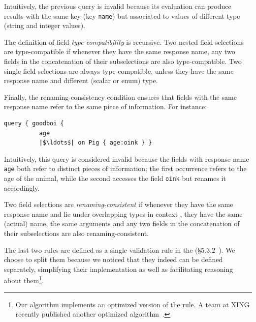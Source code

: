 Intuitively, the previous query is invalid because its evaluation can produce results with the same key 
(key \texttt{name}) but associated to values of different type (\eg string and integer values).

The definition of field \emph{type-compatibility} is recursive. Two nested
field selections are type-compatible if whenever
they have the same response name, any two fields in the concatenation of their
subselections are also type-compatible. Two single field selections
are always type-compatible, unless they have the same response
name and different (scalar or enum) type.

Finally, the renaming-consistency condition ensures that fields with
the same response name refer to the same piece of information. For
instance:
\begin{verbatim}
query { goodboi {
          age   
          |$\ldots$| on Pig { age:oink } }
\end{verbatim}

Intuitively, this query is considered invalid because the fields with response name \texttt{age} both refer to distinct pieces of information;
the first occurrence refers to the age of the animal, while the second accesses the field \texttt{oink} but renames it accordingly.


Two field selections are \emph{renaming-consistent} if whenever they have the
same response name and lie under overlapping types in context
,
they have the same (actual) name, the same arguments and any two
fields in the concatenation of their subselections are also
renaming-consistent.

The last two rules are defined as a single validation rule in the \spec (\cf\S5.3.2~\cite{gqlspec}). 
We choose to split them because we noticed that they indeed can be defined separately, simplifying their implementation as well as facilitating 
reasoning about them\footnote{Our algorithm implements an optimized version of the rule. A team at XING recently published another optimized algorithm~\cite{xingalg}.}.


